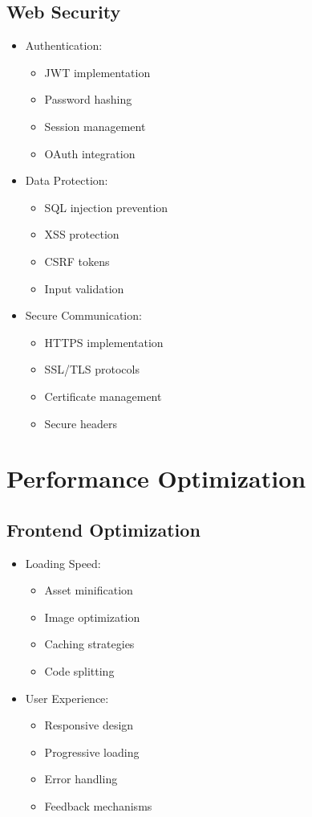 \subsection{Web Security}
\begin{itemize}
    \item Authentication:
    \begin{itemize}
        \item JWT implementation
        \item Password hashing
        \item Session management
        \item OAuth integration
    \end{itemize}
    \item Data Protection:
    \begin{itemize}
        \item SQL injection prevention
        \item XSS protection
        \item CSRF tokens
        \item Input validation
    \end{itemize}
    \item Secure Communication:
    \begin{itemize}
        \item HTTPS implementation
        \item SSL/TLS protocols
        \item Certificate management
        \item Secure headers
    \end{itemize}
\end{itemize}

\section{Performance Optimization}
\subsection{Frontend Optimization}
\begin{itemize}
    \item Loading Speed:
    \begin{itemize}
        \item Asset minification
        \item Image optimization
        \item Caching strategies
        \item Code splitting
    \end{itemize}
    \item User Experience:
    \begin{itemize}
        \item Responsive design
        \item Progressive loading
        \item Error handling
        \item Feedback mechanisms
    \end{itemize}
\end{itemize}

